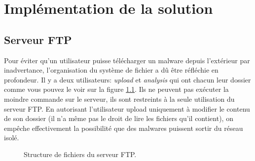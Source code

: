 
\chapter{Implémentation de la solution}





\section{Serveur FTP}

Pour éviter qu'un utilisateur puisse télécharger un malware depuis l'extérieur par inadvertance, l'organisation du système de fichier a dû être réfléchie en profondeur. Il y a deux utilisateurs: \textit{upload} et \textit{analysis} qui ont chacun leur dossier comme vous pouvez le voir sur la figure \ref{fig:ftp-folders}. Ils ne peuvent pas exécuter la moindre commande sur le serveur, ils sont restreints à la seule utilisation du serveur FTP. En autorisant l'utilisateur upload uniquement à modifier le contenu de son dossier (il n'a même pas le droit de lire les fichiers qu'il contient), on empêche effectivement la possibilité que des malwares puissent sortir du réseau isolé.


\begin{figure}
    \centering
    \caption{Structure de fichiers du serveur FTP.}
    \label{fig:ftp-folders}
\end{figure}





